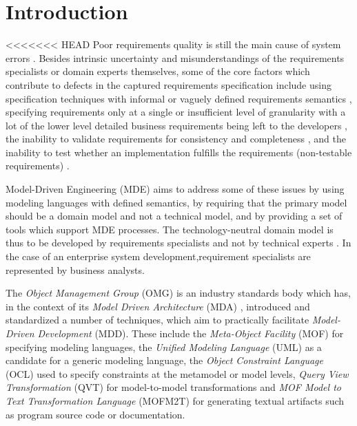 \section{Introduction}

<<<<<<< HEAD
Poor requirements quality is still the main cause of system errors \cite{heck_experiences_2008}. Besides intrinsic uncertainty and misunderstandings of the requirements specialists or domain experts themselves, some of the core factors which contribute to defects in the captured requirements specification include using specification techniques with informal or vaguely defined requirements semantics \cite{ferguson_empirical_2006}, specifying requirements only at a single or insufficient level of granularity with a lot of the lower level detailed business requirements being left to the developers \cite{espana_evaluating_2009,getBetterReference}, the inability to validate requirements for consistency and completeness \cite{somebodyPleaseFindASuitableReference}, and the inability to test whether an implementation fulfills the requirements (non-testable requirements) \cite{bashardoust-tajali_extracting_2008}.

Model-Driven Engineering (MDE) aims to address some of these issues by using modeling languages with defined semantics, by requiring that the primary model should be a domain model and not a technical model\cite{asnina_computation_2010}, and by providing a set of tools which support MDE processes. The technology-neutral domain model is thus to be developed by requirements specialists and not by technical experts \cite{asnina_computation_2010}. In the case of an enterprise system development,requirement specialists are represented by business analysts.

The {\em Object Management Group} (OMG) is an industry standards body which has, in the context of its {\em Model Driven Architecture} (MDA) \cite{siegel_developing_2001}, introduced and standardized a number of techniques, which aim to practically facilitate {\em Model-Driven Development} (MDD). These include the {\em Meta-Object Facility} (MOF) for specifying modeling languages, the {\em Unified Modeling Language} (UML) as a candidate for a generic modeling language, the {\em Object Constraint Language} (OCL) used to specify constraints at the metamodel or model levels, {\em Query View Transformation} (QVT) for model-to-model transformations and {\em MOF Model to Text Transformation Language} (MOFM2T) for generating textual artifacts such as program source code or documentation. 

